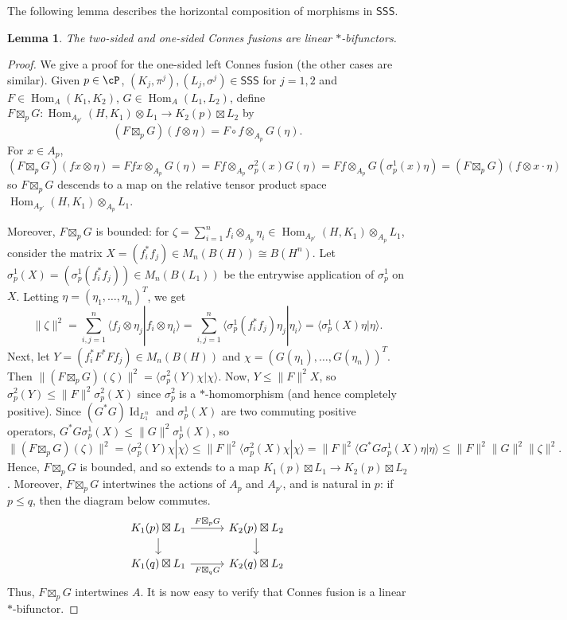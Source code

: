 \documentclass[11pt,reqno]{amsart}
\DeclareMathOperator{\Hom}{Hom}
\DeclareMathOperator{\Id}{Id}
\newcommand{\SSS}{\mathsf{SSS}}
\numberwithin{equation}{section}
\theoremstyle{plain}
\newtheorem{lemma}[equation]{Lemma}
\theoremstyle{definition}
\begin{document}
The following lemma describes the horizontal composition of morphisms in $\SSS$.

\begin{lemma}
    The two-sided and one-sided Connes fusions are linear $*$-bifunctors.
\end{lemma}


\begin{proof}
    We give a proof for the one-sided left Connes fusion (the other cases are similar). Given $p\in\cP$, $(K_j,\pi^j),(L_j,\sigma^j)\in\SSS$ for $j=1,2$ and $F\in\Hom_A(K_1,K_2)$, $G\in\Hom_A(L_1,L_2)$, define $F\boxtimes_p G:\Hom_{A_{p'}}(H,K_1)\otimes L_1\to K_2(p)\boxtimes L_2$ by
    \[
    (F\boxtimes_pG)(f\otimes \eta)=F\circ f\otimes_{A_p}\! G(\eta).
    \]
    For $x\in A_p$,
    \[
    (F\boxtimes_pG)(fx\otimes \eta)=Ffx\otimes_{A_p}\! G(\eta)=Ff\otimes_{A_p}\!\sigma^2_p(x)G(\eta)=Ff\otimes_{A_p}\! G(\sigma^1_p(x)\eta)=(F\boxtimes_pG)(f\otimes x\cdot\eta)
    \]
    so $F\boxtimes_p G$ descends to a map on the relative tensor product space $\Hom_{A_{p'}}(H,K_1)\otimes_{A_p}\! L_1$.  
    
    Moreover, $F\boxtimes_p G$ is bounded: for $\zeta=\sum_{i=1}^n f_i\otimes_{A_p}\! \eta_i\in \Hom_{A_{p'}}(H,K_1)\otimes_{A_p}\! L_1$, consider the matrix $X=(f_i^*f_j)\in M_n(B(H))\cong B(H^n)$. Let $\sigma^1_p(X)=(\sigma^1_p(f_i^*f_j))\in M_n(B(L_1))$ be the entrywise application of $\sigma^1_p$ on $X$. Letting $\eta=(\eta_1,\dots,\eta_n)^T$, we get 
    \[
    \lVert\zeta\rVert^2=\sum_{i,j=1}^n\langle f_j\otimes\eta_j|f_i\otimes\eta_i\rangle=\sum_{i,j=1}^n\langle \sigma_p^1(f_i^*f_j)\eta_j|\eta_i\rangle=\langle \sigma_p^1(X)\eta|\eta\rangle.
    \]
    Next, let $Y=(f_i^*F^*Ff_j)\in M_n(B(H))$ and $\chi=(G(\eta_1),\dots,G(\eta_n))^T$. Then $\lVert(F\boxtimes_p G)(\zeta)\rVert^2=\langle\sigma^2_p(Y)\chi|\chi\rangle$. Now, $Y\leq\lVert F\rVert^2X$, so $\sigma^2_p(Y)\leq\lVert F\rVert^2\sigma^2_p(X)$ since $\sigma^2_p$ is a $*$-homomorphism (and hence completely positive). Since $(G^*G)\Id_{L_1^n}$ and $\sigma^1_p(X)$ are two commuting positive operators, $G^*G\sigma^1_p(X)\leq\lVert G\rVert^2\sigma^1_p(X)$, so
    \[
    \lVert(F\boxtimes_p G)(\zeta)\rVert^2=\langle\sigma^2_p(Y)\chi|\chi\rangle\leq \lVert F\rVert^2\langle\sigma^2_p(X)\chi|\chi\rangle=\lVert F\rVert^2\langle G^*G\sigma^1_p(X)\eta|\eta\rangle\leq\lVert F\rVert^2\lVert G\rVert^2\lVert\zeta\rVert^2.
    \]
    Hence, $F\boxtimes_p G$ is bounded, and so extends to a map $K_1(p)\boxtimes L_1\to K_2(p)\boxtimes L_2$. Moreover, $F\boxtimes_p G$ intertwines the actions of $A_p$ and $A_{p'}$, and is natural in $p$: if $p\leq q$, then the diagram below commutes.
    \[\begin{tikzcd}[column sep=1.5em, row sep=.75em]
	{K_1(p)\boxtimes L_1} && {K_2(p)\boxtimes L_2} \\
	\\
	{K_1(q)\boxtimes L_1} && {K_2(q)\boxtimes L_2}
	\arrow["{F\boxtimes_p G}", from=1-1, to=1-3]
	\arrow[from=1-1, to=3-1]
	\arrow[from=1-3, to=3-3]
	\arrow["{F\boxtimes_q G}"', from=3-1, to=3-3]
\end{tikzcd}\]
Thus, $F\boxtimes_p G$ intertwines $A$. It is now easy to verify that Connes fusion is a linear $*$-bifunctor.
\end{proof}
\end{document}
